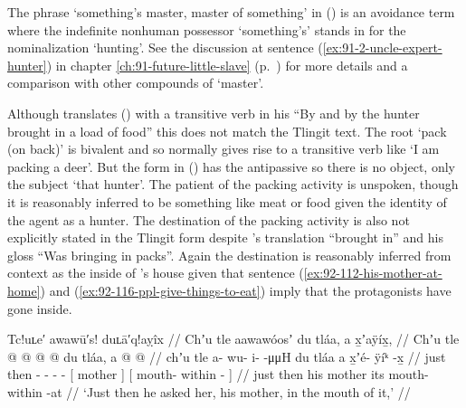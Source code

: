 The phrase  ‘something’s master, master of something’ in (\lastx) is an avoidance term where the indefinite nonhuman possessor  ‘something’s’ stands in for the nominalization  ‘hunting’.
See the discussion at sentence (\ref{ex:91-2-uncle-expert-hunter}) in chapter \ref{ch:91-future-little-slave} (p.\ \pageref{ex:91-2-uncle-expert-hunter}) for more details and a comparison with other compounds of  ‘master’.

Although \citeauthor{swanton:1909} translates (\lastx) with a transitive verb in his “By and by the hunter brought in a load of food” this does not match the Tlingit text.
The root  ‘pack (on back)’ is bivalent and so normally gives rise to a transitive verb like  ‘I am packing a deer’.
But the form in (\lastx) has the antipassive  so there is no object, only the subject  ‘that hunter’.
The patient of the packing activity is unspoken, though it is reasonably inferred to be something like meat or food given the identity of the agent as a hunter.
The destination of the packing activity is also not explicitly stated in the Tlingit form despite \citeauthor{swanton:1909}’s translation “brought in” and his gloss “Was bringing in packs”.
Again the destination is reasonably inferred from context as the inside of ’s house given that sentence (\ref{ex:92-112-his-mother-at-home}) and (\ref{ex:92-116-ppl-give-things-to-eat}) imply that the protagonists have gone inside.


\ex\label{ex:92-118-asked-mother}%
%
\begingl
	\glpreamble	Tc!uʟe′ awawū′s! duʟā′q!aỵîx //
	\glpreamble	Chʼu tle aawawóosʼ du tláa, a x̱ʼaÿíx̱, //
	\gla	Chʼu tle  @ {} @ {} @ {} @ {}
		{} du tláa, {}
		{} a  @ {} @ {} {}//
	\glb	chʼu tle a- wu- i-  -μμH
		{} du tláa {}
		{} a x̱ʼé- ÿíᵏ -x̱ {} //
	\glc	just then - - -  -
		{}[  mother {}]
		{}[  mouth- within - {}] //
	\gld	just then  {} {} {} {}
		{} his mother {}
		{} its mouth- within -at {} //
	\glft	‘Just then he asked her, his mother, in the mouth of it,’
		//
\endgl
\xe


